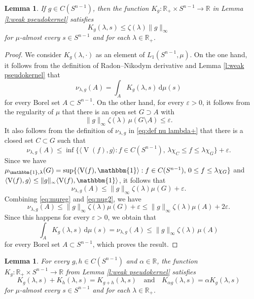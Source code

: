 \documentclass[11pt, a4paper]{amsart}
\newtheorem{lemma}[proposition]{Lemma}
\renewcommand{\d}{\,\mathrm{d}}
\newcommand{\uno}{\operatorname{\mathbbm{1}}}
\newcommand{\cm}{\zeta}
\newcommand{\rp}{\mathbb R_{\scriptscriptstyle +}}
\newcommand{\sn}{{S^{n-1}}}
\renewcommand{\d}{\,\mathrm{d}}
\newcommand{\oV}{\operatorname{V}}
\newcommand{\R}{\mathbb R}
\begin{document}
\begin{lemma}\label{l:bounded kernel}
If  $g\in C(\sn)$, then the function $K_g\colon \rp\times \sn \to \R$ in Lemma \ref{l:weak pseudokernel} satisfies 
$$K_{g}(\lambda, s) \leq \cm(\lambda) \|g\|_{\scriptscriptstyle \infty}$$
for $\mu$-almost every $s\in \sn $ and for each $\lambda\in\rp$. 
\end{lemma}
\begin{proof}
We consider $K_g(\lambda, \cdot)$ as an element of $L_1(\sn,\mu)$. On the one hand,  it follows from the definition of Radon--Nikodym derivative and Lemma \ref{l:weak pseudokernel} that  
$$ \nu_{\lambda,g}(A) = \int_A K_g(\lambda, s) \d\mu(s)$$
for every Borel set $A\subset \sn $.
On the other hand, for every $\varepsilon>0$, it follows from the regularity of $\mu$ that there is an open set $G\supset A$  with 
\begin{equation}\label{eq:mureg}
 {\|g\|_{\scriptscriptstyle \infty} \cm(\lambda)}\, \mu(G\setminus A)\leq {\varepsilon}.   
\end{equation} 
It also follows from the definition of $\nu_{\lambda,g}$ in \eqref{eq:def nu lambda+} that there is a closed set  $C\subset G$ such that 
\begin{equation}%
    \nu_{\lambda,g}(A) \leq \inf \{\langle \oV(f),g\rangle: f\in C(\sn ),\,\lambda\chi_C\leq f\leq \lambda\chi_G\}+\varepsilon.
\end{equation} 
Since we have $\mu_{\uno,\lambda}(G)=\sup\{\langle \oV(f),\uno\rangle:f\in C(\sn ),\,0\leq f\leq \lambda\chi_G\}$ and $\langle \oV(f),g\rangle\leq\|g\|_{\scriptscriptstyle \infty} \langle \oV(f),\uno\rangle$, it follows that
\begin{equation}\label{eq:nug2}
    \nu_{\lambda,g}(A) \leq \|g\|_{\scriptscriptstyle \infty} \cm(\lambda)\mu(G)+\varepsilon.
\end{equation} 
Combining \eqref{eq:mureg} and \eqref{eq:nug2}, we have 
$$\nu_{\lambda,g}(A)  \leq \|g\|_{\scriptscriptstyle \infty} \cm(\lambda)\mu(G) + \varepsilon \leq  \|g\|_{\scriptscriptstyle \infty} \cm(\lambda)\mu(A) + 2\varepsilon.$$
Since this happens for every $\varepsilon>0$, we obtain that  
$$\int_A K_g(\lambda, s) \d\mu(s)= \nu_{\lambda,g}(A) \leq \|g\|_{\scriptscriptstyle \infty} \cm(\lambda)\, \mu(A) $$
for every Borel set $A\subset \sn $, which proves the result.
\end{proof}


\begin{lemma}\label{l:kernel difference}
For every $g, h\in C(\sn )$ and $\alpha\in\mathbb{R}$, the function $K_g\colon \rp\times \sn \to \R$ from Lemma \ref{l:weak pseudokernel} satisfies 
$$K_{g}(\lambda, s) +K_{h}(\lambda, s) = K_{g+h}(\lambda, s)\quad \text{and}\quad K_{\alpha g}(\lambda,s)=\alpha K_g(\lambda,s)$$
for $\mu$-almost every $s\in \sn $ and for each $\lambda\in\rp$. 
\end{lemma}
\end{document}
